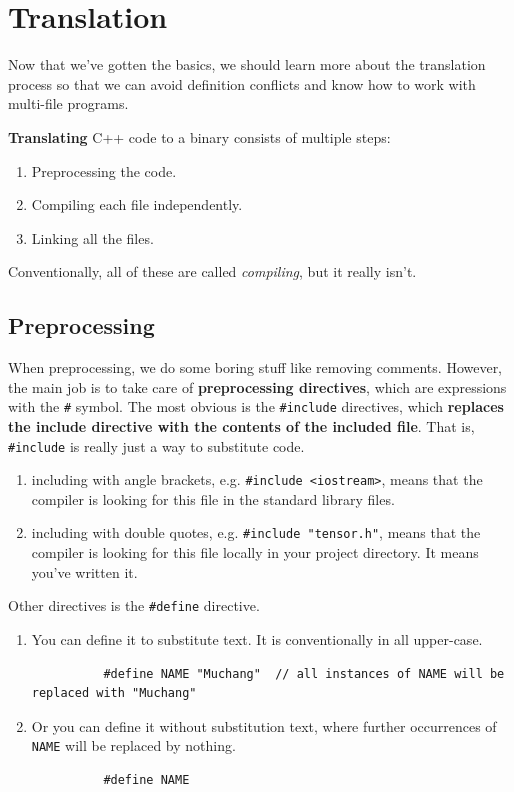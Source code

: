\documentclass{article}
\newcounter{definition}[section]
\newcounter{code}[section]
\begin{document}
\section{Translation} 

    Now that we've gotten the basics, we should learn more about the translation process so that we can avoid definition conflicts and know how to work with multi-file programs. 

    \begin{definition}[Translation]
      \label{def:translation}
      \textbf{Translating} C++ code to a binary consists of multiple steps: 
      \begin{enumerate}
        \item Preprocessing the code. 
        \item Compiling each file independently. 
        \item Linking all the files. 
      \end{enumerate}
      Conventionally, all of these are called \textit{compiling}, but it really isn't. 
    \end{definition}

  \subsection{Preprocessing} 

    When preprocessing, we do some boring stuff like removing comments. However, the main job is to take care of \textbf{preprocessing directives}, which are expressions with the \texttt{\#} symbol. The most obvious is the \texttt{\#include} directives, which \textbf{replaces the include directive with the contents of the included file}. That is, \texttt{\#include} is really just a way to substitute code.  
    \begin{enumerate}
      \item including with angle brackets, e.g. \texttt{\#include <iostream>}, means that the compiler is looking for this file in the standard library files. 
      \item including with double quotes, e.g. \texttt{\#include "tensor.h"}, means that the compiler is looking for this file locally in your project directory. It means you've written it. 
    \end{enumerate}
    
    Other directives is the \texttt{\#define} directive. 
    \begin{enumerate}
      \item You can define it to substitute text. It is conventionally in all upper-case.  
        \begin{lstlisting}
          #define NAME "Muchang"  // all instances of NAME will be replaced with "Muchang"
        \end{lstlisting}
      \item Or you can define it without substitution text, where further occurrences of \texttt{NAME} will be replaced by nothing. 
        \begin{lstlisting}
          #define NAME 
        \end{lstlisting}
    \end{enumerate}
\end{document}
